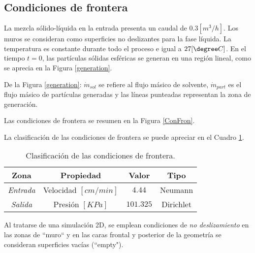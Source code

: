 \subsection{Condiciones de frontera}

\noindent
\justify

La mezcla s\'olido-l\'iquida en la entrada presenta un caudal de $0.3 \left[m^3 /h \right]$. Los muros se consideran como superficies no deslizantes para la fase l\'iquida. La temperatura es constante durante todo el proceso e igual a $27 [\degree C]$. En el tiempo $t=0$, las part\'iculas s\'olidas esf\'ericas se generan en una regi\'on lineal, como se aprecia en la Figura \ref{generation}.



\noindent
\justify

De la Figura \ref{generation}: $\dot{m} _{sol}$ se refiere al flujo m\'asico de solvente, $\dot{m} _{part}$ es el flujo m\'asico de part\'iculas generadas y las l\'ineas punteadas representan la zona de generaci\'on.

\noindent
\justify

Las condiciones de frontera se resumen en la Figura \ref{ConFron}.



\noindent
\justify

La clasificaci\'on de las condiciones de frontera se puede apreciar en el Cuadro \ref{CFT}.

\begin{table}[h!]
	\centering
	\begin{tabular}{|c|c|c|c|}
		\hline
		\textbf{Zona} & \textbf{Propiedad} & \textbf{Valor} & \textbf{Tipo} \\ \hline
		\textit{Entrada} & Velocidad $[cm/min]$ & $4.44$ & Neumann \\ \hline
		\textit{Salida} & Presi\'on $[KPa]$ & $101.325$ & Dirichlet \\ \hline
	\end{tabular}
	\caption{Clasificaci\'on de las condiciones de frontera.}
	\label{CFT}
\end{table}

\noindent
\justify

Al tratarse de una simulaci\'on 2D, se emplean condiciones de \textit{no deslizamiento} en las zonas de ``muro`` y en las caras frontal y posterior de la geometr\'ia se consideran superficies vac\'ias (``empty").